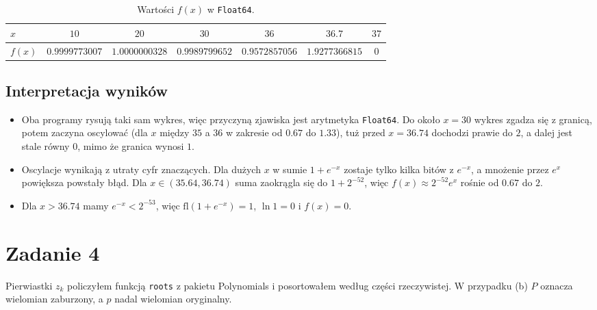 \documentclass[11pt,a4paper]{article}
\begin{document}
\begin{table}[H]
\centering
\footnotesize
\caption{Wartości $f(x)$ w \texttt{Float64}.}
\begin{tabular}{lcccccc}
\toprule
$x$ & $10$ & $20$ & $30$ & $36$ & $36.7$ & $37$ \\
\midrule
$f(x)$ & $0.9999773007$ & $1.0000000328$ & $0.9989799652$ & $0.9572857056$ & $1.9277366815$ & $0$ \\
\bottomrule
\end{tabular}
\end{table}

\subsection*{Interpretacja wyników}
\begin{itemize}
    \item Oba programy rysują taki sam wykres, więc przyczyną zjawiska jest arytmetyka \texttt{Float64}. Do około $x = 30$ wykres zgadza się z granicą, potem zaczyna oscylować (dla $x$ między $35$ a $36$ w zakresie od $0.67$ do $1.33$), tuż przed $x = 36.74$ dochodzi prawie do $2$, a dalej jest stale równy $0$, mimo że granica wynosi $1$.
    \item Oscylacje wynikają z utraty cyfr znaczących. Dla dużych $x$ w sumie $1 + e^{-x}$ zostaje tylko kilka bitów z $e^{-x}$, a mnożenie przez $e^{x}$ powiększa powstały błąd. Dla $x \in (35.64, 36.74)$ suma zaokrągla się do $1 + 2^{-52}$, więc $f(x) \approx 2^{-52} e^{x}$ rośnie od $0.67$ do $2$.
    \item Dla $x > 36.74$ mamy $e^{-x} < 2^{-53}$, więc $\text{fl}(1 + e^{-x}) = 1$, $\ln 1 = 0$ i $f(x) = 0$.
\end{itemize}


\section{Zadanie 4}

Pierwiastki $z_k$ policzyłem funkcją \texttt{roots} z pakietu Polynomials i posortowałem według części rzeczywistej. W przypadku (b) $P$ oznacza wielomian zaburzony, a $p$ nadal wielomian oryginalny.
\end{document}
